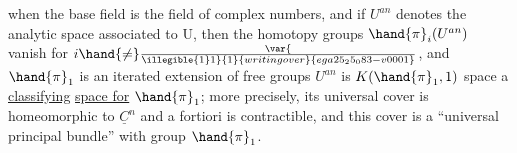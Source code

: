 
when the base field is the field of complex numbers, and if $U^{an}$
denotes the analytic space associated to U, then the homotopy groups
$\hand{\pi}_i(U^{an})$ vanish for $i\hand{\neq}\var{\over{\illegible{1}}{1}}{1}{writing over}{ega25_25_083-v0001}$, and  $\hand{\pi}_1$ is an iterated extension
of free groups   $U^{an}$  is
 $K(\hand{\pi}_1 ,1)$ space\hand{,} a \uline{classifying} \uline{space for} $\hand{\pi}_1$; more
precisely, its universal cover is homeomorphic to $\underline{C}^n$ and a fortiori
is contractible, and this cover is a “universal principal bundle” with
group $\hand{\pi}_1$.

